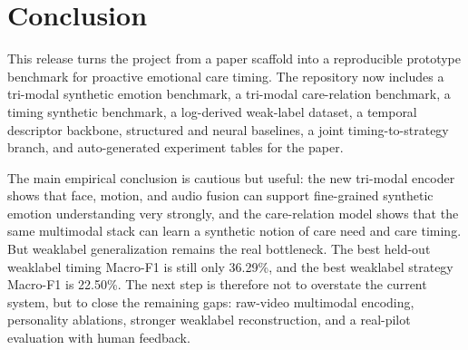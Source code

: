 \section{Conclusion}
This release turns the project from a paper scaffold into a reproducible prototype benchmark for proactive emotional care timing. The repository now includes a tri-modal synthetic emotion benchmark, a tri-modal care-relation benchmark, a timing synthetic benchmark, a log-derived weak-label dataset, a temporal descriptor backbone, structured and neural baselines, a joint timing-to-strategy branch, and auto-generated experiment tables for the paper.

The main empirical conclusion is cautious but useful: the new tri-modal encoder shows that face, motion, and audio fusion can support fine-grained synthetic emotion understanding very strongly, and the care-relation model shows that the same multimodal stack can learn a synthetic notion of care need and care timing. But weaklabel generalization remains the real bottleneck. The best held-out weaklabel timing Macro-F1 is still only 36.29\%, and the best weaklabel strategy Macro-F1 is 22.50\%. The next step is therefore not to overstate the current system, but to close the remaining gaps: raw-video multimodal encoding, personality ablations, stronger weaklabel reconstruction, and a real-pilot evaluation with human feedback.

